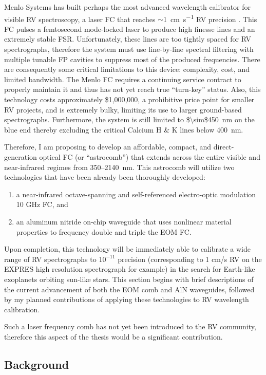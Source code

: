 \documentclass[11pt]{article}
\begin{document}
Menlo Systems has built perhaps the most advanced wavelength calibrator for visible RV spectroscopy, a laser FC that reaches $\sim$\SI{1}{\centi\meter\per\second} RV precision \citep{Probst2014}. This FC pulses a femtosecond mode-locked laser to produce high finesse lines and an extremely stable FSR. Unfortunately, these lines are too tightly spaced for RV spectrographs, therefore the system must use line-by-line spectral filtering with multiple tunable FP cavities to suppress most of the produced frequencies. There are consequently some critical limitations to this device: complexity, cost, and limited bandwidth. The Menlo FC requires a continuing service contract to properly maintain it and thus has not yet reach true ``turn-key'' status. Also, this technology costs approximately \$1,000,000, a prohibitive price point for smaller RV projects, and is extremely bulky, limiting its use to larger ground-based spectrographs. Furthermore, the system is still limited to \SI{$\sim$450}{\nano\meter} on the blue end thereby excluding the critical Calcium H \& K lines below \SI{400}{\nano\meter}.

Therefore, I am proposing to develop an affordable, compact, and direct-generation optical FC (or ``astrocomb'') that extends across the entire visible and near-infrared regimes from 350–\SI{2140}{\nano\meter}. This astrocomb will utilize two technologies that have been already been thoroughly developed:
\begin{enumerate}
    \item a near-infrared octave-spanning and self-referenced electro-optic modulation 10 GHz FC, and
    \item an aluminum nitride on-chip waveguide that uses nonlinear material properties to frequency double and triple the EOM FC.
\end{enumerate}
Upon completion, this technology will be immediately able to calibrate a wide range of RV spectrographs to $10^{-11}$ precision (corresponding to 1 cm/s RV on the EXPRES high resolution spectrograph for example) in the search for Earth-like exoplanets orbiting sun-like stars. This section begins with brief descriptions of the current advancement of both the EOM comb and AlN waveguides, followed by my planned contributions of applying these technologies to RV wavelength calibration.

Such a laser frequency comb has not yet been introduced to the RV community, therefore this aspect of the thesis would be a significant contribution.


\subsection{Background}
\end{document}
